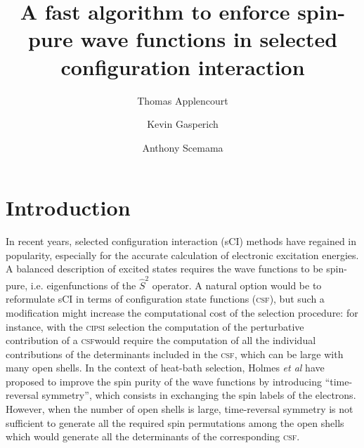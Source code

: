 \documentclass[aip,jcp,reprint,showkeys]{revtex4-1}
\newcommand{\stwo}{\hat{S}^2}
\newcommand{\cipsi}{\textsc{cipsi}}
\newcommand{\csf}{\textsc{csf}}
\begin{document}
\title{A fast algorithm to enforce spin-pure wave functions in selected configuration interaction}

\author{Thomas Applencourt}
\author{Kevin Gasperich}
\author{Anthony Scemama}

\begin{abstract}
\end{abstract}


\maketitle

\section{Introduction}

In recent years, selected configuration interaction (sCI) methods have regained in
popularity,\cite{Greer_1998,Stampfuss_2005,Bytautas_2009,Booth_2009,Giner_2013,Buenker_2014,Holmes_2016,Ohtsuka_2017,Coe_2018}
especially for the accurate calculation of electronic excitation
energies.\cite{Coe_2013,Schriber_2017,Holmes_2017,Loos_2018,Scemama_2018,Dash_2018}
A balanced description of excited states requires the wave functions to be
spin-pure, i.e. eigenfunctions of the $\stwo$ operator.
A natural option would be to reformulate sCI in terms of configuration state
functions (\csf), but such a modification might increase the computational cost
of the selection procedure: for instance, with the \cipsi
selection\cite{Bender_1969,Whitten_1969,Huron_1973} the computation of the
perturbative contribution of a \csf would require the computation of all the
individual contributions of the determinants included in the \csf, which can
be large with many open shells.
In the context of heat-bath selection, Holmes \textit{et al} have proposed to
improve the spin purity of the wave functions by introducing ``time-reversal
symmetry''\cite{Holmes_2017}, which consists in exchanging the spin labels of
the electrons.
However, when the number of open shells is large, time-reversal symmetry is not
sufficient to generate all the required spin permutations among the open shells
which would generate all the determinants of the corresponding \csf.
\end{document}
